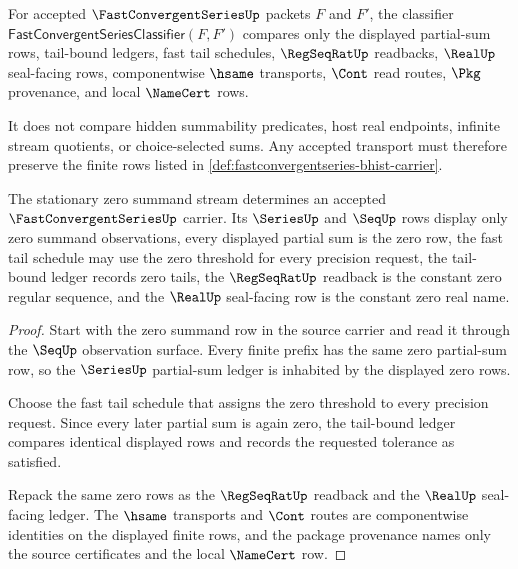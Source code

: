 \begin{definition}
\label{def:fastconvergentseries-classifier}
For accepted $\FastConvergentSeriesUp$ packets $F$ and $F'$, the classifier $\mathsf{FastConvergentSeriesClassifier}(F,F')$ compares only the displayed partial-sum rows, tail-bound ledgers, fast tail schedules, $\RegSeqRatUp$ readbacks, $\RealUp$ seal-facing rows, componentwise $\hsame$ transports, $\Cont$ read routes, $\Pkg$ provenance, and local $\NameCert$ rows.

It does not compare hidden summability predicates, host real endpoints, infinite stream quotients, or choice-selected sums. Any accepted transport must therefore preserve the finite rows listed in \autoref{def:fastconvergentseries-bhist-carrier}.
\end{definition}

\begin{theorem}
\label{thm:fastconvergentseries-constant-zero-seed}
The stationary zero summand stream determines an accepted $\FastConvergentSeriesUp$ carrier. Its $\SeriesUp$ and $\SeqUp$ rows display only zero summand observations, every displayed partial sum is the zero row, the fast tail schedule may use the zero threshold for every precision request, the tail-bound ledger records zero tails, the $\RegSeqRatUp$ readback is the constant zero regular sequence, and the $\RealUp$ seal-facing row is the constant zero real name.
\end{theorem}
\begin{proof}
Start with the zero summand row in the source carrier and read it through the $\SeqUp$ observation surface. Every finite prefix has the same zero partial-sum row, so the $\SeriesUp$ partial-sum ledger is inhabited by the displayed zero rows.

Choose the fast tail schedule that assigns the zero threshold to every precision request. Since every later partial sum is again zero, the tail-bound ledger compares identical displayed rows and records the requested tolerance as satisfied.

Repack the same zero rows as the $\RegSeqRatUp$ readback and the $\RealUp$ seal-facing ledger. The $\hsame$ transports and $\Cont$ routes are componentwise identities on the displayed finite rows, and the package provenance names only the source certificates and the local $\NameCert$ row.
\end{proof}

